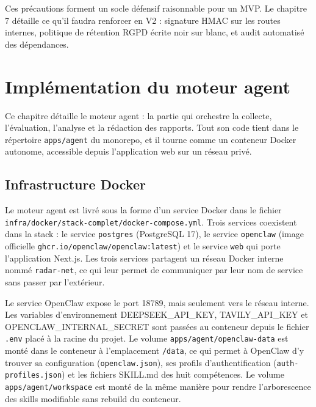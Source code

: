 \documentclass[12pt,a4paper,openany]{report}
\begin{document}
Ces précautions forment un socle défensif raisonnable pour un MVP. Le chapitre 7 détaille ce qu'il faudra renforcer en V2 : signature HMAC sur les routes internes, politique de rétention RGPD écrite noir sur blanc, et audit automatisé des dépendances.

\chapter{Implémentation du moteur agent}
\label{chap:moteur-agent}

Ce chapitre détaille le moteur agent : la partie qui orchestre la collecte, l'évaluation, l'analyse et la rédaction des rapports. Tout son code tient dans le répertoire \texttt{apps/agent} du monorepo, et il tourne comme un conteneur Docker autonome, accessible depuis l'application web sur un réseau privé.

\section{Infrastructure Docker}
\label{sec:infra-docker}

Le moteur agent est livré sous la forme d'un service Docker dans le fichier \texttt{infra/docker/stack-complet/docker-compose.yml}. Trois services coexistent dans la stack : le service \texttt{postgres} (PostgreSQL 17), le service \texttt{openclaw} (image officielle \texttt{ghcr.io/openclaw/openclaw:latest}) et le service \texttt{web} qui porte l'application Next.js. Les trois services partagent un réseau Docker interne nommé \texttt{radar-net}, ce qui leur permet de communiquer par leur nom de service sans passer par l'extérieur.

Le service OpenClaw expose le port 18789, mais seulement vers le réseau interne. Les variables d'environnement DEEPSEEK\_API\_KEY, TAVILY\_API\_KEY et OPENCLAW\_INTERNAL\_SECRET sont passées au conteneur depuis le fichier \texttt{.env} placé à la racine du projet. Le volume \texttt{apps/agent/openclaw-data} est monté dans le conteneur à l'emplacement \texttt{/data}, ce qui permet à OpenClaw d'y trouver sa configuration (\texttt{openclaw.json}), ses profils d'authentification (\texttt{auth-profiles.json}) et les fichiers SKILL.md des huit compétences. Le volume \texttt{apps/agent/workspace} est monté de la même manière pour rendre l'arborescence des skills modifiable sans rebuild du conteneur.
\end{document}
